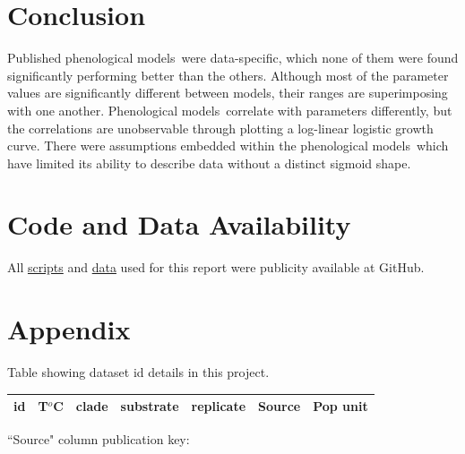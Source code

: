 \documentclass[a4paper, 11pt]{article}
\newcommand{\pms}{phenological models}
\newcommand{\Pms}{Phenological models}
\begin{document}
	\section*{Conclusion}
	Published \pms\ were data-specific, which none of them were found significantly performing better than the others.  Although most of the parameter values are significantly different between models, their ranges are superimposing with one another.  \Pms\ correlate with parameters differently, but the correlations are unobservable through plotting a log-linear logistic growth curve.  There were assumptions embedded within the \pms\ which have limited its ability to describe data without a distinct sigmoid shape.
	
	\section*{Code and Data Availability}
	All \href{https://github.com/ph-u/CMEECourseWork_pmH/tree/master/MiniProject/code}{scripts} and \href{https://github.com/ph-u/CMEECourseWork_pmH/tree/master/MiniProject/data}{data} used for this report were publicity available at GitHub.
	\nocite{*}\printbibliography
	
	\section*{Appendix}
\begin{table}[H]
		\caption{Table showing dataset id details in this project.}\label{table:source}
\end{table}
\begin{small}
	\begin{longtable}{l|llllll}
		id&T$^{o}$C&clade&substrate&replicate&Source&Pop unit\\\hline
	\end{longtable}
\end{small}
``Source" column publication key:\\
\begin{longtable}{p{.05\linewidth}p{.9\linewidth}}
\end{longtable}
\end{document}
